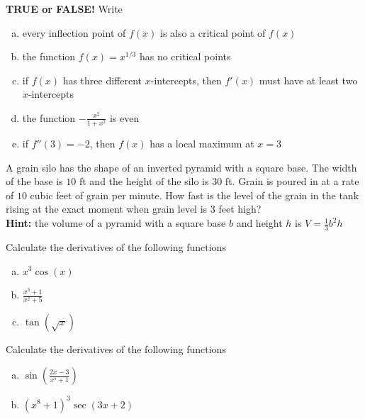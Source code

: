 \documentclass[11pt]{exam}
\theoremstyle{definition}
\begin{document}
\begin{questions}

\addpoints

\question[10]\mbox{}
\textbf{TRUE or FALSE!}  Write 
\begin{enumerate}[(a)]
\item every inflection point of $f(x)$ is also a critical point of $f(x)$
\vspace{1.2in}
\item the function $f(x) = x^{1/3}$ has no critical points
\vspace{1.2in}
\item if $f(x)$ has three different $x$-intercepts, then $f'(x)$ must have at least two $x$-intercepts
\vspace{1.2in}
\item the function $-\frac{x^2}{1+x^2}$ is even
\vspace{1.2in}
\item if $f''(3) = -2$, then $f(x)$ has a local maximum at $x=3$
\vspace{1.2in}
\end{enumerate}

\newpage
\question[10]\mbox{}
A grain silo has the shape of an inverted pyramid with a square base.
The width of the base is $10$ ft and the height of the silo is $30$ ft.
Grain is poured in at a rate of $10$ cubic feet of grain per minute.
How fast is the level of the grain in the tank rising at the exact moment when grain level is $3$ feet high?\\
\textbf{Hint:} the volume of a pyramid with a square base $b$ and height $h$ is $V = \frac{1}{3}b^2h$

\newpage
\question[10]
Calculate the derivatives of the following functions
\begin{enumerate}[(a)]
\item $x^3\cos(x)$
\vspace{3in}
\item $\frac{x^3+1}{x^2+5}$
\vspace{3in}
\item $\tan(\sqrt{x})$
\end{enumerate}

\newpage
\question[10]
Calculate the derivatives of the following functions
\begin{enumerate}[(a)]
\item $\sin\left(\frac{2x-3}{x^5+1}\right)$
\vspace{4in}
\item $(x^8+1)^3\sec(3x+2)$
\end{enumerate}



\end{questions}
\end{document}
